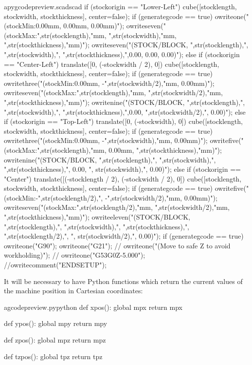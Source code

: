 \documentclass{ltxdoc}
\begin{document}
\begin{writecode}{a}{pygcodepreview.scad}{scad}
{{    if (stockorigin == "Lower-Left") {
    cube([stocklength, stockwidth, stockthickness], center=false);
if (generategcode == true) {
owriteone("(stockMin:0.00mm, 0.00mm, 0.00mm)");
owriteseven("(stockMax:",str(stocklength),"mm, ",str(stockwidth),"mm, ",str(stockthickness),"mm)");
owriteseven("(STOCK/BLOCK, ",str(stocklength),", ",str(stockwidth),", ",str(stockthickness),",0.00, 0.00, 0.00)");
    }
}	else if (stockorigin == "Center-Left") {
    translate([0, (-stockwidth / 2), 0]){
      cube([stocklength, stockwidth, stockthickness], center=false);
if (generategcode == true) {
owritethree("(stockMin:0.00mm, -",str(stockwidth/2),"mm, 0.00mm)");
owriteseven("(stockMax:",str(stocklength),"mm, ",str(stockwidth/2),"mm, ",str(stockthickness),"mm)");
owritenine("(STOCK/BLOCK, ",str(stocklength),", ",str(stockwidth),", ",str(stockthickness),",0.00, ",str(stockwidth/2),", 0.00)");
    }
    } 
	} else if (stockorigin == "Top-Left") {
    translate([0, (-stockwidth), 0]){
      cube([stocklength, stockwidth, stockthickness], center=false);
    }
if (generategcode == true) {
owritethree("(stockMin:0.00mm, -",str(stockwidth),"mm, 0.00mm)");
owritefive("(stockMax:",str(stocklength),"mm, 0.00mm, ",str(stockthickness),"mm)");
owritenine("(STOCK/BLOCK, ",str(stocklength),", ",str(stockwidth),", ",str(stockthickness),", 0.00, ", str(stockwidth),", 0.00)");
}
}	else if (stockorigin == "Center") {
    translate([(-stocklength / 2), (-stockwidth / 2), 0]){
      cube([stocklength, stockwidth, stockthickness], center=false);
    }
if (generategcode == true) {
owritefive("(stockMin:-",str(stocklength/2),", -",str(stockwidth/2),"mm, 0.00mm)");
owriteseven("(stockMax:",str(stocklength/2),"mm, ",str(stockwidth/2),"mm, ",str(stockthickness),"mm)");
owriteeleven("(STOCK/BLOCK, ",str(stocklength),", ",str(stockwidth),", ",str(stockthickness),", ",str(stocklength/2),", ", str(stockwidth/2),", 0.00)");
}
}
}
if (generategcode == true) {
	owriteone("G90");
	owriteone("G21");
//	owriteone("(Move to safe Z to avoid workholding)");
//	owriteone("G53G0Z-5.000");
}
//owritecomment("ENDSETUP");
}

\end{writecode}
\addtocounter{pyscad}{93}

It will be necessary to have Python functions which return the current values of the 
machine position in Cartesian coordinates: 

\lstset{firstnumber=\thegcpy}
\begin{writecode}{a}{gcodepreview.py}{python}
def xpos():
    global mpx
    return mpx

def ypos():
    global mpy
    return mpy

def zpos():
    global mpz
    return mpz

def tzpos():
    global tpz
    return tpz

\end{writecode}
\addtocounter{gcpy}{16}
\end{document}
